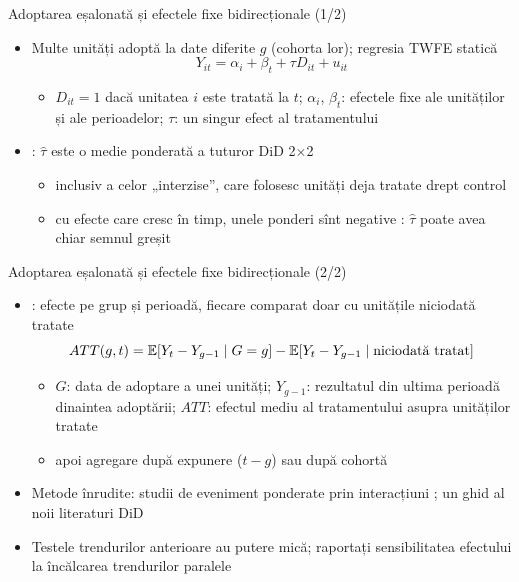 \begin{frame}{Adoptarea eșalonată și efectele fixe bidirecționale (1/2)}
\itemsize{\small}
\begin{itemize}
    \item Multe unități adoptă la date diferite $g$ (cohorta lor); regresia TWFE statică \[ Y_{it} = \alpha_i + \beta_t + \tau D_{it} + u_{it} \]
    \begin{itemize}
        \item $D_{it} = 1$ dacă unitatea $i$ este tratată la $t$; $\alpha_i$, $\beta_t$: efectele fixe ale unităților și ale perioadelor; $\tau$: un singur efect al tratamentului
    \end{itemize}
    \item {}: $\hat\tau$ este o medie ponderată a tuturor DiD 2$\times$2
    \begin{itemize}
        \item inclusiv a celor „interzise”, care folosesc unități deja tratate drept control
        \item cu efecte care cresc în timp, unele ponderi sînt negative : $\hat\tau$ poate avea chiar semnul greșit
    \end{itemize}
\end{itemize}
\end{frame}

\begin{frame}{Adoptarea eșalonată și efectele fixe bidirecționale (2/2)}
\itemsize{\small}
\begin{itemize}
    \item {}: efecte pe grup și perioadă, fiecare comparat doar cu unitățile niciodată tratate \[ ATT(g, t) = \mathbb{E}[Y_t - Y_{g-1}\mid G = g] - \mathbb{E}[Y_t - Y_{g-1}\mid \text{niciodată tratat}] \]
    \begin{itemize}
        \item $G$: data de adoptare a unei unități; $Y_{g-1}$: rezultatul din ultima perioadă dinaintea adoptării; $ATT$: efectul mediu al tratamentului asupra unităților tratate
        \item apoi agregare după expunere ($t - g$) sau după cohortă
    \end{itemize}
    \item Metode înrudite: studii de eveniment ponderate prin interacțiuni ; un ghid al noii literaturi DiD 
    \item Testele trendurilor anterioare au putere mică; raportați sensibilitatea efectului la încălcarea trendurilor paralele
\end{itemize}
\end{frame}

